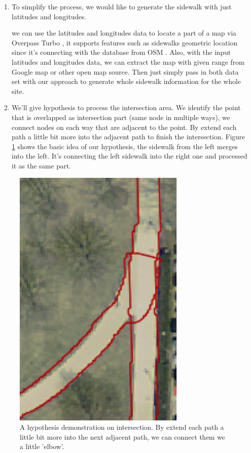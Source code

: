 \begin{enumerate}
    \item To simplify the process, we would like to generate the sidewalk with just latitudes and longitudes.
    
    we can use the latitudes and longitudes data to locate a part of a map via Overpass Turbo \cite{overpass_turbo}, it supports features such as sidewalks geometric location since it's connecting with the database from \ac{OSM} \cite{OpenStreetMap}. Also, with the input latitudes and longitudes data, we can extract the map with given range from Google map or other open map source. Then just simply pass in both data set with our approach to generate whole sidewalk information for the whole site. 
    
    \item We'll give hypothesis to process the intersection area. We identify the point that is overlapped as intersection part (same node in multiple ways), we connect nodes on each way that are adjacent to the point. By extend each path a little bit more into the adjacent path to finish the intersection. Figure \ref{fig:intersection} shows the basic idea of our hypothesis, the sidewalk from the left merges into the left. It's connecting the left sidewalk into the right one and processed it as the same part. 
    
\end{enumerate}

\begin{figure}
    \centering
    \includegraphics[width=0.75\textwidth]{Figures/intersection.png}
    \caption[Intersection Demonstration]{A hypothesis demonstration on intersection. By extend each path a little bit more into the next adjacent path, we can connect them we a little 'elbow'.}
    \label{fig:intersection}
\end{figure}